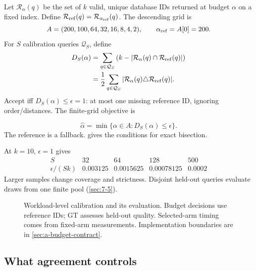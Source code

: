 Let $\mathcal R_\alpha(q)$ be the set of $k$ valid, unique database IDs
returned at budget $\alpha$ on a fixed index. Define
$\mathcal R_{\rm ref}(q)=\mathcal R_{\alpha_{\rm ref}}(q)$. The descending grid is
\begin{equation}
 A=(200,100,64,32,16,8,4,2),\qquad \alpha_{\rm ref}=A[0]=200.
 \label{eq:6-grid}
\end{equation}
For $S$ calibration queries $\mathcal Q_S$, define
\begin{equation}
 \begin{aligned}
 D_S(\alpha)
 &=\sum_{q\in\mathcal Q_S}
   \left(k-|\mathcal R_\alpha(q)\cap\mathcal R_{\rm ref}(q)|\right)\\
 &=\frac12\sum_{q\in\mathcal Q_S}
   |\mathcal R_\alpha(q)\triangle\mathcal R_{\rm ref}(q)|.
 \end{aligned}
 \label{eq:6-agreement}
\end{equation}
Accept iff $D_S(\alpha)\leq\epsilon=1$: at most one missing reference ID, ignoring order/distances. The finite-grid objective is

\begin{equation}
 \widehat\alpha=\min\{\alpha\in A:D_S(\alpha)\leq\epsilon\}.
 \label{eq:6-selection-objective}
\end{equation}
The reference is a fallback.  gives the conditions for exact bisection.

At $k=10$, $\epsilon=1$ gives
\[
 \begin{array}{c|rrrr}S&32&64&128&500\\\hline
 \epsilon/(Sk)&0.003125&0.0015625&0.00078125&0.0002
 \end{array}
\]
Larger samples change coverage and strictness. Disjoint held-out queries evaluate draws from one finite pool (\cref{sec:7-5}).

\begin{figure}[htbp]
\centering

\caption[Workload-level calibration and evaluation]{Workload-level calibration and its evaluation. Budget decisions
use reference IDs; GT assesses held-out quality. Selected-arm timing comes from fixed-arm measurements. Implementation boundaries are in
\cref{sec:a-budget-contract}.}
\label{fig:6-calibration}
\end{figure}

\subsection{What agreement controls}


